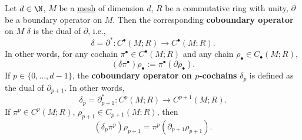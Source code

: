 \begin{definition}
  Let
    $d \in \N$,
    $M$ be a \hyperref[cmc:mesh:definition]{mesh} of dimension $d$,
    $R$ be a commutative ring with unity,
    $\partial$ be a boundary operator on $M$.
  Then the corresponding \textbf{coboundary operator} on $M$ $\delta$ is the
  dual of $\partial$, i.e.,
  \begin{equation}
    \delta = \partial^* \colon C^\bullet(M; R) \to C^\bullet(M; R).
  \end{equation}
  In other words, for any cochain $\pi^\bullet \in C^\bullet(M; R)$ and any
  chain $\rho_\bullet \in C_\bullet(M; R)$,
  \begin{equation}
    (\delta \pi^\bullet) \rho_\bullet := \pi^\bullet(\partial \rho_\bullet).
  \end{equation}
  If $p \in \{0, ..., d - 1\}$, the \textbf{coboundary operator on $p$-cochains}
  $\delta_p$ is defined as the dual of $\partial_{p + 1}$.
  In other words,
  \begin{equation}
    \delta_p = \partial_{p + 1}^* \colon C^p(M; R) \to C^{p + 1}(M; R).
  \end{equation}
  If $\pi^p \in C^p(M; R)$, $\rho_{p + 1} \in C_{p + 1}(M; R)$, then
  \begin{equation}
    (\delta_p \pi^p) \rho_{p + 1} = \pi^p(\partial_{p + 1} \rho_{p + 1}).
  \end{equation}
\end{definition}
